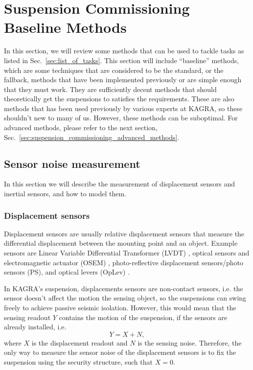 \section{Suspension Commissioning Baseline Methods \label{sec:suspension_commissioning_baseline_methods}}
In this section, we will review some methods that can be used to tackle tasks as listed in Sec.~\ref{sec:list_of_tasks}.
This section will include ``baseline'' methods, which are some techniques that are considered to be the standard, or the fallback, methods that have been implemented previously or are simple enough that they must work.
They are sufficiently decent methods that should theoretically get the suspensions to satisfies the requirements.
These are also methods that has been used previously by various experts at KAGRA, so these shouldn't new to many of us.
However, these methods can be suboptimal.
For advanced methods, please refer to the next section, Sec.~\ref{sec:suspension_commissioning_advanced_methods}.

\subsection{Sensor noise measurement}
In this section we will describe the measurement of displacement sensors and inertial sensors, and how to model them.

\subsubsection{Displacement sensors \label{displacement_sensors_baseline}}
Displacement sensors are usually relative displacement sensors that measure the differential displacement between the mounting point and an object.
Example sensors are Linear Variable Differential Transformer (LVDT) \cite{Akutsu:2021auw}, optical sensors and electromagnetic actuator (OSEM) \cite{Akutsu:2020efg, use_of_osems}, photo-reflective displacement sensors/photo sensors (PS), and optical levers (OpLev) \cite{sensing_matrices_oplev, length_sensing_oplev, optical_lever_for_kagra}.

In KAGRA's suspension, displacements sensors are non-contact sensors, i.e. the sensor doesn't affect the motion the sensing object, so the suspensions can swing freely to achieve passive seismic isolation.
However, this would mean that the sensing readout $Y$ contains the motion of the suspension, if the sensors are already installed, i.e.
\begin{equation}
	Y=X+N,
	\label{eqn:sensing_readout}
\end{equation}
where $X$ is the displacement readout and $N$ is the sensing noise.
Therefore, the only way to measure the sensor noise of the displacement sensors is to fix the suspension using the security structure, such that $X=0$.

